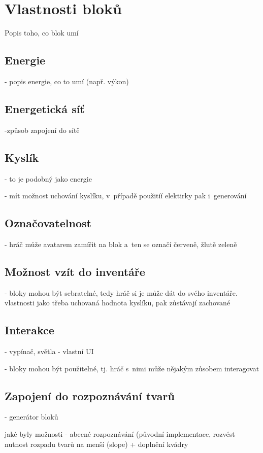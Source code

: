 
\section{Vlastnosti bloků}

Popis toho, co blok umí


\subsection{Energie}

- popis energie, co to umí (např. výkon)

\subsection{Energetická síť}

-způsob zapojení do sítě

\subsection{Kyslík}

- to je podobný jako energie

- mít možnost uchování kyslíku, v~případě použitíí elektirky pak i~generování


\subsection{Označovatelnost}

- hráč může avatarem zamířit na blok a~ten se označí červeně, žlutě zeleně



\subsection{Možnost vzít do inventáře}

- bloky mohou být sebratelné, tedy hráč si je může dát do svého inventáře. vlastnosti jako třeba uchovaná hodnota kyslíku, pak zůstávají zachované


\subsection{Interakce}

- vypínač, světla - vlastní UI


- bloky mohou být použitelné, tj. hráč s~nimi může nějakým zůsobem interagovat


\subsection{Zapojení do rozpoznávání tvarů}

- generátor bloků

jaké byly možnosti - abecné rozpoznávání (původní implementace, rozvést nutnost rozpadu tvarů na menší (slope) + doplnění kvádry

